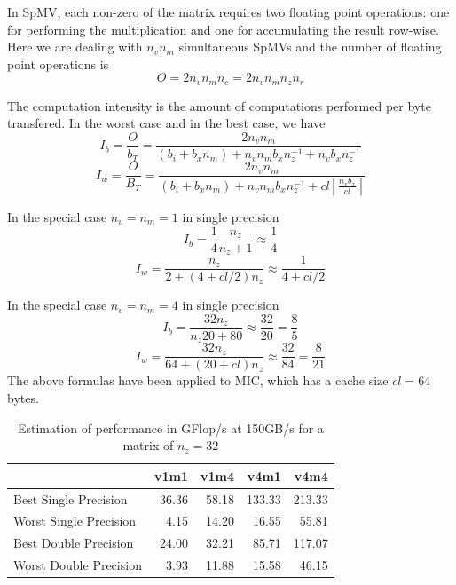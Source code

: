 \documentclass[10pt,conference,compsocconf]{IEEEtran}
\newcommand{\ceil}[1]{\left\lceil#1\right\rceil}
\begin{document}
In SpMV, each non-zero of the matrix requires two floating point
operations: one for performing the multiplication and one for
accumulating the result row-wise. Here we are dealing with $n_v n_m$
simultaneous SpMVs and the number of floating point operations is
$$O = 2 n_v n_m n_c = 2 n_v n_m n_z n_r$$

The computation intensity is the amount of computations performed per
byte transfered. In the worst case and in the best case, we have
$$I_b = \frac{O}{b_T} = \frac{2 n_v n_m}{ (b_i + b_x n_m) + n_v n_m b_x n_z^{-1} + n_v b_x n_z^{-1} }$$
$$I_w = \frac{O}{B_T} = \frac{2 n_v n_m}{(b_i+b_x n_m) + n_v n_m b_x n_z^{-1} + cl \ceil{\frac{n_vb_x}{cl}} }$$

In the special case $n_v=n_m=1$ in single precision
$$I_b = \frac{1}{4} \frac{ n_z }{ n_z + 1} \approx \frac{1}{4}$$
$$I_w = \frac{n_z }{2  + (4+cl/2)  n_z} \approx \frac{1}{4+cl/2}$$

In the special case $n_v=n_m=4$ in single precision
$$I_b = \frac{32 n_z }{ n_z 20 + 80} \approx \frac{32}{20} = \frac{8}{5} $$
$$I_w = \frac{32 n_z }{64 + (20+cl) n_z} \approx \frac{32}{84} = \frac{8}{21} $$
The above formulas have been applied to MIC, which has a cache size $cl=64$ bytes.

\begin{table}
  \centering
  \begin{tabular}{|l|r|r|r|r|}
    \hline
                           & v1m1  & v1m4  & v4m1   & v4m4  \\
    \hline
    Best Single Precision  & 36.36 & 58.18 & 133.33 & 213.33\\
    Worst Single Precision &  4.15 & 14.20 &  16.55 &  55.81\\
    Best Double Precision  & 24.00 & 32.21 &  85.71 & 117.07\\
    Worst Double Precision &  3.93 & 11.88 &  15.58 &  46.15\\
    \hline
  \end{tabular}
  \caption{Estimation of performance in GFlop/s at 150GB/s for a
    matrix of $n_z = 32$}
\end{table}
\end{document}

